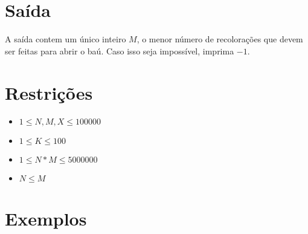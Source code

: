 \section*{Saída}

A saída contem um único inteiro $M$, o menor número de recolorações que devem ser feitas para abrir o baú.
Caso isso seja impossível, imprima $-1$.

\section*{Restrições}

\begin{itemize}
\item $1 \leq N,M,X \leq 100000$
\item $1 \leq K \leq 100$
\item $1 \leq N*M \leq 5000000$
\item $ N \leq M$
\end{itemize}


\section*{Exemplos}

\exemplo
